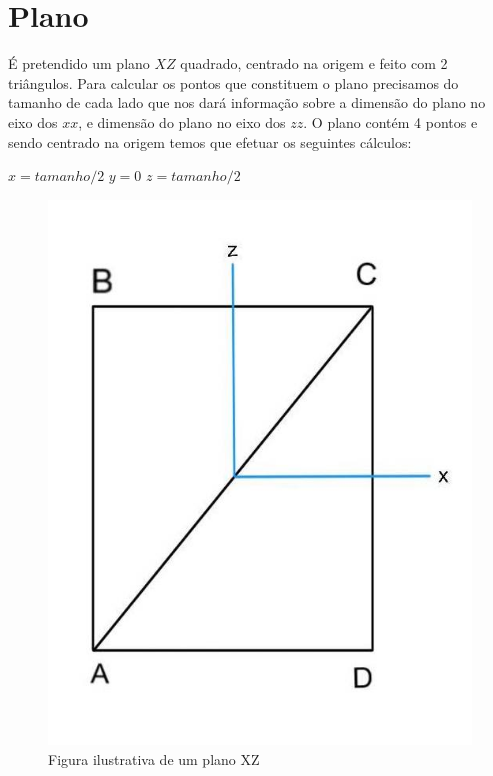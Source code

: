\documentclass{article}
\begin{document}
\section{Plano}
É pretendido um plano $XZ$ quadrado, centrado na origem e feito com 2 triângulos. 
Para calcular os pontos que constituem o plano precisamos do tamanho de cada lado que nos dará informação sobre a dimensão do plano
no eixo dos $xx$, e dimensão do plano no eixo dos $zz$. 
O plano contém 4 pontos e sendo centrado na origem temos que efetuar os seguintes cálculos: \newline
\begin{center}
$x = tamanho/2$ \newline
$y = 0$ \newline
$z = tamanho/2$ \newline
\end{center}
\begin{figure}[H]
\centering\includegraphics[scale=0.4]{plano} 
\caption{\label{fig:controller}Figura ilustrativa de um plano XZ}
\end{figure} 
\end{document}
